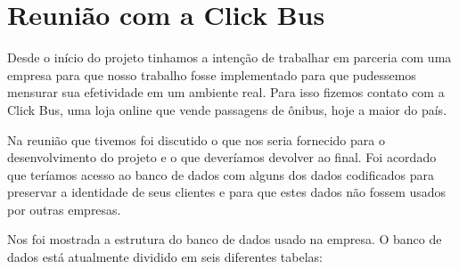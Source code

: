 \chapter[Reunião com a Click Bus]{Reunião com a Click Bus}
\label{chap:Reuniao_com_a_click_bus}

Desde o início do projeto tinhamos a intenção de trabalhar em parceria com uma empresa para que nosso trabalho fosse implementado para que pudessemos mensurar sua efetividade em um ambiente real. Para isso fizemos contato com a Click Bus, uma loja online que vende passagens de ônibus, hoje a maior do país.

Na reunião que tivemos foi discutido o que nos seria fornecido para o desenvolvimento do projeto e o que deveríamos devolver ao final. Foi acordado que teríamos acesso ao banco de dados com alguns dos dados codificados para preservar a identidade de seus clientes e para que estes dados não fossem usados por outras empresas.

Nos foi mostrada a estrutura do banco de dados usado na empresa. O banco de dados está atualmente dividido em  seis diferentes tabelas:

